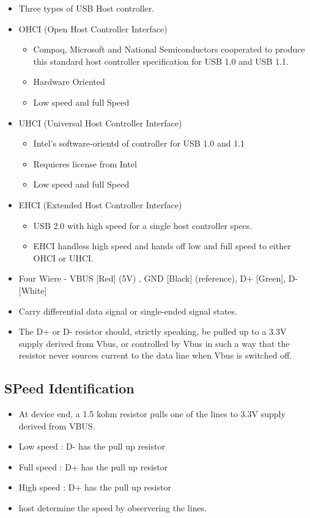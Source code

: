\documentclass{article}
\begin{document}
\begin{itemize}
    \item Three types of USB Host controller.
    \item OHCI (Open Host Controller Interface)
          \begin{itemize}
              \item Compaq, Microsoft and National Semiconductors cooperated to produce this standard host controller specification for USB 1.0 and USB 1.1.
              \item Hardware Oriented
              \item Low speed and full Speed
          \end{itemize}
    \item UHCI (Universal Host Controller Interface)
          \begin{itemize}
              \item Intel's software-orientd of controller for USB 1.0 and 1.1
              \item Requieres license from Intel
              \item Low speed and full Speed
          \end{itemize}
    \item EHCI (Extended Host Controller Interface)
          \begin{itemize}
              \item USB 2.0 with high speed for a single host controller specs.
              \item EHCI handless high speed and hands off low and full speed to either OHCI or UHCI.
          \end{itemize}
    \item Four Wiere - VBUS [Red] (5V) , GND [Black] (reference), D+ [Green], D- [White]
    \item Carry differential data signal or single-ended signal states.
    \item The D+ or D- resistor should, strictly speaking, be pulled up to a 3.3V supply derived from Vbus, or controlled by Vbus in such a way that the resistor never sources current to the data line when Vbus is switched off.
\end{itemize}



\subsection{SPeed Identification}
\begin{itemize}
    \item At device end, a 1.5 kohm resistor pulls one of the lines to 3.3V supply derived from VBUS.
    \item Low speed : D- has the pull up resistor
    \item Full speed : D+ has the pull up resistor
    \item High speed : D+ has the pull up resistor
    \item host determine the speed by observering the lines.
\end{itemize}
\end{document}
